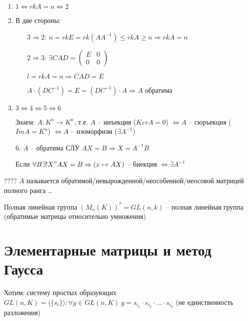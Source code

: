 \documentclass[12pt]{article}
\newcommand{\q}[1]{\langle #1 \rangle}
\begin{document}
\begin{enumerate}
    \item $1 \Leftrightarrow rkA = n \Leftrightarrow 2$
    \item В две стороны:
    
    \begin{itemize}
        \item[$3 \Rightarrow 2$:] $n = rkE = rk(AA^{-1}) \leq rkA \geq n \Rightarrow rkA = n$
        \item[$2 \Rightarrow 3$:] $\exists CAD = \begin{pmatrix}
            E & 0 \\
            0 & 0
        \end{pmatrix}$

        $l = rkA = n \Rightarrow CAD = E$

        $A \cdot (DC^{-1}) = E = (DC^{-1}) \cdot A \Rightarrow A$ обратима
    \end{itemize}
    \item $3 \Leftrightarrow 4 \Leftrightarrow 5 \Leftrightarrow 6$
    
    Знаем: $A : K^n \to K^n$, т.е. $A$ -- инъекция ($KerA = 0$) $\Leftrightarrow A$ -- сюръекция ($ImA = K^n$) $\Leftrightarrow A$ -- изоморфизм ($\exists A^{-1}$) 

    \item[6.] $A$ -- обратима СЛУ $AX = B \Rightarrow X = A^{-1}B$
    
    Если $\forall B \exists! X " AX = B \Rightarrow (x \mapsto AX)$ -- биекция $\Leftrightarrow \exists A^{-1}$
\end{enumerate}

\begin{defin}{????}
    $A$ называется обратимой/невырожденной/неособенной/неосовой матрицей полного ранга \dots
\end{defin}

\begin{defin}{Полная линейная группа}
    $(M_n(K))^* = GL(n, k)$ -- полная линейная группа (обратимые матрицы относительно умножения)
\end{defin}

\section{Элементарные матрицы и метод Гаусса}

Хотим: систему простых образующих $GL(n, K) = \q{\{s_i\}} : \forall g \in GL(n, K)\ g = s_{i_1} \cdot s_{i_2} \cdot \ldots \cdot s_{i_k}$ (не единственность разложения)
\end{document}
